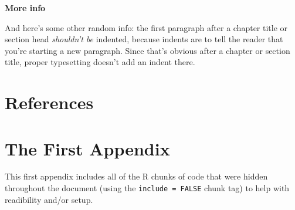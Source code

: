 \documentclass[ms]{uncgdissertationexp}
\theoremstyle{plain}
\theoremstyle{definition}
\theoremstyle{remark}
\begin{document}
  \textbf{More info}
  
  And here's some other random info: the first paragraph after a chapter
  title or section head \emph{shouldn't be} indented, because indents are
  to tell the reader that you're starting a new paragraph. Since that's
  obvious after a chapter or section title, proper typesetting doesn't add
  an indent there.
  
  \backmatter
  
  \chapter*{References}\label{references}
  
  \noindent
  
  \setlength{\parindent}{-0.20in} \setlength{\leftskip}{0.20in}
  \setlength{\parskip}{8pt}
  
  \appendix
  
  \chapter{The First Appendix}\label{the-first-appendix}
  
  This first appendix includes all of the R chunks of code that were
  hidden throughout the document (using the \texttt{include\ =\ FALSE}
  chunk tag) to help with readibility and/or setup.
  
\end{document}
